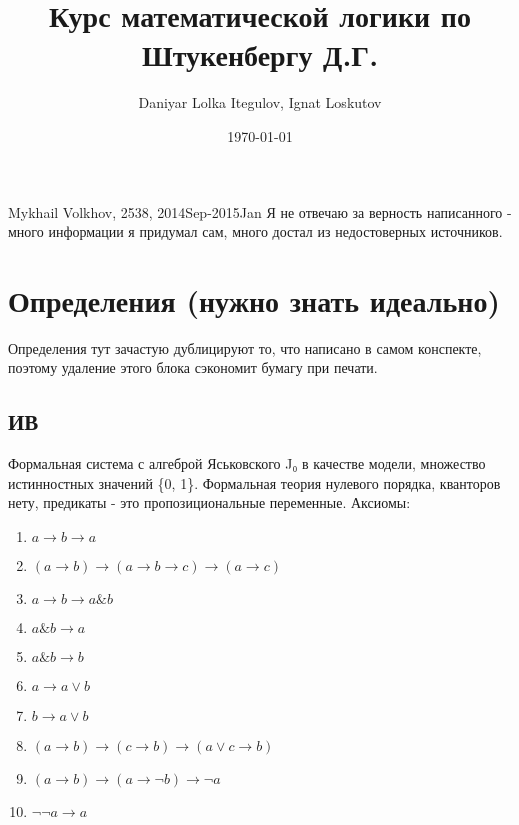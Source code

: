 \documentclass[12pt]{article}
\author{Daniyar Lolka Itegulov, Ignat Loskutov}
\date{\today}
\title{Курс математической логики по Штукенбергу Д.Г.}
\begin{document}
\theoremstyle{definition}
\newtheorem{definition}{Определение}[section]
\newtheorem*{example}{Пример}
\newtheorem{theorem}{Теорема}[section]
\newtheorem{axiom}{Аксиома}[section]
\newtheorem{lemma}[theorem]{Лемма}

\newcommand{\s}[1]{\texttt{#1}}
\newcommand{\xl}{$\lambda$}
\newcommand{\+}{\lambda}
\newcommand{\bredmath}{\ \longrightarrow_\beta\ }
\newcommand{\bred}{$\bredmath$}
\newcommand{\mbred}{$\ \longrightarrow\!\!\!\!\rightarrow_\beta\ $}
\newcommand{\lid}[1]{\textit{#1}}
\newcommand{\concat}{\hat{\ \ }}

\def\ra{\rightarrow}

\def\from#1{\par \parbox{0.7\textwidth}{\par \hfill\raggedleft \it #1}} 

\newenvironment{epigraph}%
{\begin{list}{}{\setlength{\leftmargin}{0.3\textwidth}}\item[]}%
{\end{list}} 

\maketitle
\tableofcontents


Mykhail Volkhov, 2538, 2014Sep-2015Jan
Я не отвечаю за верность написанного - много информации
я придумал сам, много достал из недостоверных источников.

\section{Определения (нужно знать идеально)}
\label{sec-2}
Определения тут зачастую дублицируют то, что написано в самом
конспекте, поэтому удаление этого блока сэкономит бумагу при
печати.
\subsection{ИВ}
\label{sec-2-1}
Формальная система с алгеброй Яськовского J₀ в качестве модели, множество
истинностных значений \{0, 1\}. Формальная теория нулевого порядка, кванторов
нету, предикаты - это пропозициональные переменные.
Аксиомы:
\begin{enumerate}
\item $a \to b \to a$
\item $(a \to b) \to (a \to b \to c) \to (a \to c)$
\item $a \to b \to a \& b$
\item $a \& b \to a$
\item $a \& b \to b$
\item $a \to a \lor b$
\item $b \to a \lor b$
\item $(a \to b) \to (c \to b) \to (a \lor c \to b)$
\item $(a \to b) \to (a \to \lnot b) \to \lnot a$
\item $\lnot \lnot a \to a$
\end{enumerate}
\end{document}
